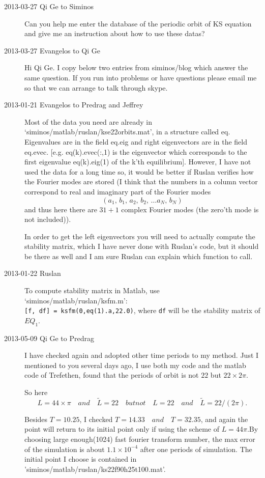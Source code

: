 \begin{description}
\item[2013-03-27 Qi Ge to Siminos]
Can you help me enter the database of the periodic orbit of KS equation and give me an instruction about how to use these datas?


\item[2013-03-27 Evangelos to Qi Ge]
Hi Qi Ge. I copy below two entries from siminos/blog which answer the same question.
If you run into problems or have questions please email me so that we can arrange to talk through skype.


\item[2013-01-21 Evangelos to Predrag and Jeffrey] Most of the data you need are
already in `siminos/matlab/ruslan/kse22orbits.mat', in a structure called eq.
Eigenvalues are in the field eq.eig and right eigenvectors are in the field eq.evec.
[e.g. eq(k).evec(:,1) is the eigenvector which corresponds to the first eigenvalue eq(k).eig(1)
of the k'th equilibrium]. However, I have not used the data for a long time so, it would
be better if Ruslan verifies how the Fourier modes are stored (I think that the numbers
in a column vector correspond to real and imaginary part of the Fourier modes
\[
 (a_1,\, b_1,\, a_2,\, b_2,\, \ldots a_N,\, b_N)
\]
and thus here there are $31+1$ complex Fourier modes (the zero'th mode is not included)).

In order to get the left eigenvectors you will need to actually compute the
stability matrix, which I have never done with Ruslan's code, but it should be
there as well and I am sure Ruslan can explain which function to call.
\item[2013-01-22 Ruslan] To compute stability matrix in Matlab, use `siminos/matlab/ruslan/ksfm.m':\\ {\tt [f, df] = ksfm(0,eq(1).a,22.0)}, where {\tt df} will be the stability matrix of $EQ_1$.

\item[2013-05-09 Qi Ge to Predrag] I have checked again and adopted other time periods to my method. Just I mentioned to you several days ago, I use both my code and the matlab code of Trefethen, found that the periods of orbit is not \(22\) but \(22\times2\pi\).

    So here \begin{equation}L = 44\times{\pi}\quad and \quad \widetilde{L} = 22 \quad but not \quad L = 22 \quad and\quad  \widetilde{L} = 22/(2\pi).\end{equation}

    Besides \(T = 10.25\), I checked \(T = 14.33 \quad and \quad T = 32.35\), and again the point will return to its initial point only if using the scheme of \(L = 44\pi\).By choosing large enough(1024) fast fourier transform number, the max error of the simulation is about \(1.1\times{10^{-4}}\) after one periods of simulation. The initial point I choose is contained in 'siminos/matlab/ruslan/ks22f90h25t100.mat'.


\end{description}
